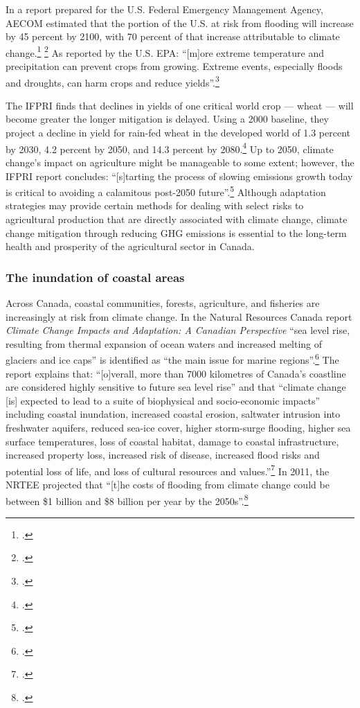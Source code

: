 \documentclass[10pt]{article}
\begin{document}
In a report prepared for the U.S. Federal Emergency Management Agency, AECOM estimated that the portion of the U.S. at risk from flooding will increase by 45 percent by 2100, with 70 percent of that increase attributable to climate change.\footcite[][p. ES-7]{FEMAFlood} \footcite[See also: ][]{MJFlood}
As reported by the U.S. EPA: ``[m]ore extreme temperature and precipitation can prevent crops from growing. Extreme events, especially floods and droughts, can harm crops and reduce yields''.\footcite[][]{EPAAgFoodImpacts}



The IFPRI finds that declines in yields of one critical world crop --- wheat --- will become greater the longer mitigation is delayed. 
Using a 2000 baseline, they project a decline in yield for rain-fed wheat in the developed world of 1.3 percent by 2030, 4.2 percent by 2050, and 14.3 percent by 2080.\footcite[][p. 85]{Farming2050}
Up to 2050, climate change's impact on agriculture might be manageable to some extent; however, the IFPRI report concludes: ``[s]tarting the process of slowing emissions growth today is critical to avoiding a calamitous post-2050 future''.\footcite[][p. xxi]{Farming2050}
Although adaptation strategies may provide certain methods for dealing with select risks to agricultural production that are directly associated with climate change, climate change mitigation through reducing GHG emissions is essential to the long-term health and prosperity of the agricultural sector in Canada.



	\subsubsection{The inundation of coastal areas}
	\label{sec:inundationcoastal}

	
	
Across Canada, coastal communities, forests, agriculture, and fisheries are increasingly at risk from climate change.
In the Natural Resources Canada report \emph{Climate Change Impacts and Adaptation: A Canadian Perspective}  ``sea level rise, resulting from thermal expansion of ocean waters and increased melting of glaciers and ice caps'' is identified as ``the main issue for marine regions''.\footcite[][p. xvi]{Lemmen2010}
The report explains that: ``[o]verall, more than 7000 kilometres of Canada's coastline are considered highly sensitive to future sea level rise'' and that ``climate change [is] expected to lead to a suite of biophysical and socio-economic impacts'' including coastal inundation, increased coastal erosion, saltwater intrusion into freshwater aquifers, reduced sea-ice cover, higher storm-surge flooding, higher sea surface temperatures, loss of coastal habitat, damage to coastal infrastructure, increased property loss, increased risk of disease, increased flood risks and potential loss of life, and loss of cultural resources and values.''\footcite[][p. xvii]{Lemmen2010}
In 2011, the NRTEE projected that ``[t]he costs of flooding from climate change could be between \$1 billion and \$8 billion per year by the 2050s''.\footcite[][p.16]{NRTEEPrice}
\end{document}

